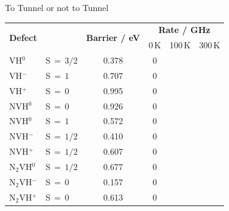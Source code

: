 \documentclass[final]{beamer}
\newlength{\colwidth}
\begin{document}
\begin{frame}[t]
\begin{columns}[t]
\begin{column}{\colwidth}
\begin{block}{To Tunnel or not to Tunnel}

    \begin{table}[h!]
      \centering
      \begin{tabular}{l l c  c c c}
        \toprule
          \multirow{2}{*}{\textbf{Defect}}
        & \multirow{2}{*}{}
        & \multirow{2}{*}{\textbf{Barrier / eV}}
        & \multicolumn{3}{c}{\textbf{Rate / GHz}} \\
        & & & 0\,K & 100\,K & 300\,K \\
        \midrule
        VH$^{0}$ &S$\,=\,3/2$ & 0.378 & 0\\
        VH$^{-}$ &S$\,=\,1$ & 0.707 & 0\\
        VH$^{+}$ &S$\,=\,0$ & 0.995 & 0\\
        NVH$^{0}$ &S$\,=\,0$ & 0.926 & 0\\
        NVH$^{0}$ &S$\,=\,1$ & 0.572 & 0\\
        NVH$^{-}$ &S$\,=\,1/2$ &  0.410 & 0\\
        NVH$^{+}$ &S$\,=\,1/2$ &  0.607 & 0\\
        N$_2$VH$^{0}$ &S$\,=\,1/2$ & 0.677 & 0\\
        N$_2$VH$^{-}$ &S$\,=\,0$  & 0.157 & 0\\
        N$_2$VH$^{+}$ &S$\,=\,0$  & 0.613 & 0\\


\end{tabular}
\end{table}
\end{block}
\end{column}
\end{columns}
\end{frame}
\end{document}
